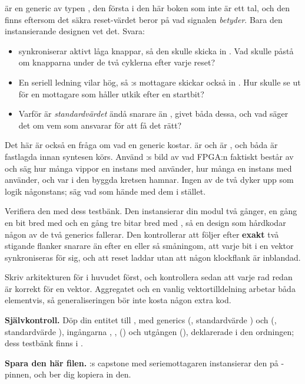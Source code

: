   är en generic av typen , den första i den här boken som
inte är ett tal, och den finns eftersom det säkra reset-värdet beror på vad signalen \emph{betyder}.
Bara den instansierande designen vet det. Svara:
\begin{itemize}
  \item {} synkroniserar aktivt låga knappar, så den skulle skicka in .
    Vad skulle  påstå om knapparna under de två cyklerna efter varje reset?
  \item En seriell ledning vilar hög, så :s mottagare skickar också in .
    Hur skulle  se ut för en mottagare som håller utkik efter en startbit?
  \item Varför är \emph{standardvärdet} ändå  snarare än , givet båda dessa,
    och vad säger det om vem som ansvarar för att få det rätt?
\end{itemize}

 Det här är också en fråga om vad en generic kostar.  är
 och  är , och båda är fastlagda innan
syntesen körs. Använd :s bild av vad FPGA:n faktiskt består av och säg hur
många vippor en instans med  använder, hur många en instans med 
använder, och var i den byggda kretsen  hamnar. Ingen av de två dyker upp som logik
någonstans; säg vad som hände med dem i stället.

 Verifiera den med dess testbänk. Den instansierar din modul två gånger, en gång en bit
bred med  och en gång tre bitar bred med , så en design som
hårdkodar någon av de två generics fallerar. Den kontrollerar att  följer
 efter \textbf{exakt} två stigande flanker snarare än efter en eller så småningom,
att varje bit i en vektor synkroniseras för sig, och att reset laddar  utan att någon
klockflank är inblandad.

\note[Tips]Skriv arkitekturen för  i huvudet först, och kontrollera sedan att varje
rad redan är korrekt för en vektor. Aggregatet  och en vanlig
vektortilldelning arbetar båda elementvis, så generaliseringen bör inte kosta någon extra kod.


\begin{selfcheck}
\textbf{Självkontroll.} Döp din entitet till , med generics 
(, standardvärde ) och  (,
standardvärde ), ingångarna , , 
() och utgången 
(), deklarerade i den ordningen; dess testbänk finns i
.

\textbf{Spara den här filen.} :s capstone med seriemottagaren instansierar den på
-pinnen, och ber dig kopiera in den.
\end{selfcheck}

